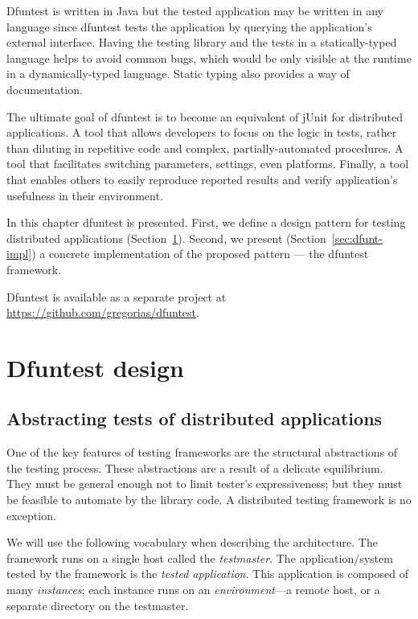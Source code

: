 Dfuntest is written in Java but the tested application may be written in any language since dfuntest tests the application by querying the application's external interface.
Having the testing library and the tests in a statically-typed language helps to avoid common bugs, which would be only visible at the runtime in a dynamically-typed language. 
Static typing also provides a way of documentation.

The ultimate goal of dfuntest is to become an equivalent of jUnit for distributed applications.
A tool that allows developers to focus on the logic in tests, rather than diluting in repetitive code and complex, partially-automated procedures.
A tool that facilitates switching parameters, settings, even platforms.
Finally, a tool that enables others to easily reproduce reported results and verify application's usefulness in their environment.

In this chapter dfuntest is presented.
First, we define a design pattern for testing distributed applications (Section~\ref{sec:dfuntest-design}).
Second, we present (Section~\ref{sec:dfunt-impl}) a concrete implementation of the proposed pattern --- the dfuntest framework.

Dfuntest is available as a separate project at \url{https://github.com/gregorias/dfuntest}.

\section{Dfuntest design}\label{sec:dfuntest-design}

\subsection{Abstracting tests of distributed applications}
One of the key features of testing frameworks are the structural abstractions of
the testing process. These abstractions are a result of a delicate equilibrium.
They must be general enough not to limit tester's expressiveness; but they must
be feasible to automate by the library code. A distributed testing framework
is no exception.

We will use the following vocabulary when describing the architecture. 
The framework runs on a single host called the \emph{testmaster}.
The application/system tested by the framework is the \emph{tested application}.
This application is composed of many \emph{instances};
each instance runs on an \emph{environment}---a remote host, or a separate directory on the testmaster.

